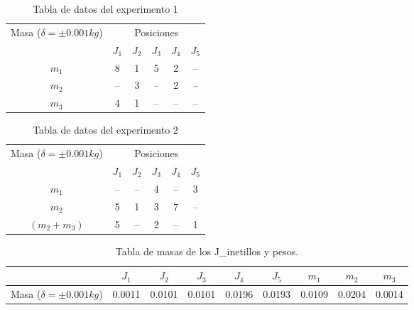 \documentclass[../main.tex]{subfiles}
\begin{document}
\begin{table}[H]
    \centering
    \begin{tabular}{c|c|c|c|c|c}
        \hline
        \multirow{2}{*}{Masa ($\delta = \pm 0.001kg$)}     
         & \multicolumn{5}{c}{Posiciones}\\
        \cline{2-6}
              &  $J_1$  &  $J_2$  &  $J_3$  &  $J_4$  &  $J_5$ \\  
        \hline
        $m_1$ &  8   &  1   &  5   &  2   &  -- \\   
        $m_2$ &  --  &  3   &  --  &  2   &  -- \\ 
        $m_3$ &  4   &  1   &  --  &  --  &  -- \\ 
        \hline
    \end{tabular}
    \label{ref:table1}
    \caption{Tabla de datos del experimento 1}
\end{table}

\begin{table}[H]
    \centering
    \begin{tabular}{c|c|c|c|c|c}
        \hline
        \multirow{2}{*}{Masa ($\delta = \pm 0.001kg$)}     
         & \multicolumn{5}{c}{Posiciones}\\
        \cline{2-6}
             &  $J_1$  &  $J_2$  &  $J_3$  &  $J_4$  &  $J_5$ \\  
        \hline
        $m_1$ &  --  &  --   &  4  &  --  &  3 \\ 
        $m_2$ &  5   &  1    &  3  &  7   &  -- \\   
        $(m_2 + m_3)$  &  5   &  --  &  2  &  --  &  1 \\ 
        \hline
    \end{tabular}
    \label{ref:table2}
    \caption{Tabla de datos del experimento 2}
\end{table}

\begin{table}[H]
    \centering
    \begin{tabular}{c|c|c|c|c|c|c|c|c}
    \cline{2-9}
                                  &  $J_1$   &  $J_2$    &  $J_3$    &  $J_4$   &  $J_5$  & $m_1 $  & $m_2 $  & $m_3$\\ 
    \hline
    Masa ($\delta = \pm 0.001kg$) &  0.0011  &  0.0101  &  0.0101  &  0.0196 & 0.0193 & 0.0109 & 0.0204 & 0.0014 \\
    \hline 
    \end{tabular}
    \caption{Tabla de masas de los J_inetillos y pesos.}
\end{table}
\end{document}
